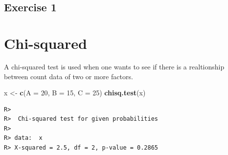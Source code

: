 \documentclass[english,10pt,a4paper,oneside]{book}
\newenvironment{Shaded}{\begin{snugshade}}{\end{snugshade}}
\newcommand{\DataTypeTok}[1]{\textcolor[rgb]{0.13,0.29,0.53}{#1}}
\newcommand{\DecValTok}[1]{\textcolor[rgb]{0.00,0.00,0.81}{#1}}
\newcommand{\KeywordTok}[1]{\textcolor[rgb]{0.13,0.29,0.53}{\textbf{#1}}}
\newcommand{\NormalTok}[1]{#1}
\newcommand{\StringTok}[1]{\textcolor[rgb]{0.31,0.60,0.02}{#1}}
\begin{document}
\hypertarget{exercise-1-8}{%
\section{Exercise 1}\label{exercise-1-8}}

\hypertarget{chi-squared}{%
\chapter{Chi-squared}\label{chi-squared}}

A chi-squared test is used when one wants to see if there is a realtionship between count data of two or more factors.

\begin{Shaded}
\begin{Highlighting}[]
\NormalTok{x <-}\StringTok{ }\KeywordTok{c}\NormalTok{(}\DataTypeTok{A =} \DecValTok{20}\NormalTok{, }\DataTypeTok{B =} \DecValTok{15}\NormalTok{, }\DataTypeTok{C =} \DecValTok{25}\NormalTok{)}
\KeywordTok{chisq.test}\NormalTok{(x)}
\end{Highlighting}
\end{Shaded}

\begin{verbatim}
R> 
R>  Chi-squared test for given probabilities
R> 
R> data:  x
R> X-squared = 2.5, df = 2, p-value = 0.2865
\end{verbatim}


\end{document}
